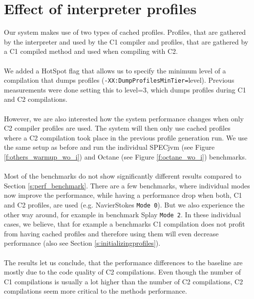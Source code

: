 \section{Effect of interpreter profiles}
\label{s:perf_interpreter_profiles}
Our system makes use of two types of cached profiles. Profiles, that are gathered by the interpreter and used by the C1 compiler and profiles, that are gathered by a C1 compiled method and used when compiling with C2.
\\\\
We added a HotSpot flag that allows us to specify the minimum level of a compilation that dumps profiles (\texttt{-XX:DumpProfilesMinTier=}level).
Previous measurements were done setting this to level=3, which dumps profiles during C1 and C2 compilations.
\\\\
However, we are also interested how the system performance changes when only C2 compiler profiles are used. The system will then only use cached profiles where a C2 compilation took place in the previous profile generation run. We use the same setup as before and run the individual SPECjvm (see Figure \ref{f:others_warmup_wo_i}) and Octane (see Figure \ref{f:octane_wo_i}) benchmarks. 
\\\\
Most of the benchmarks do not show significantly different results compared to Section \ref{s:perf_benchmark}. There are a few benchmarks, where individual modes now improve the performance, while having a performance drop when both, C1 and C2 profiles, are used (e.g. NavierStokes \texttt{Mode 0}). But we also experience the other way around, for example in benchmark Splay \texttt{Mode 2}. In these individual cases, we believe, that for example a benchmarks C1 compilation does not profit from having cached profiles and therefore using them will even decrease performance (also see Section \ref{s:initializingprofiles}).
\\\\
The results let us conclude, that the performance differences to the baseline are mostly due to the code quality of C2 compilations. Even though the number of C1 compilations is usually a lot higher than the number of C2 compilations, C2 compilations seem more critical to the methods performance.
